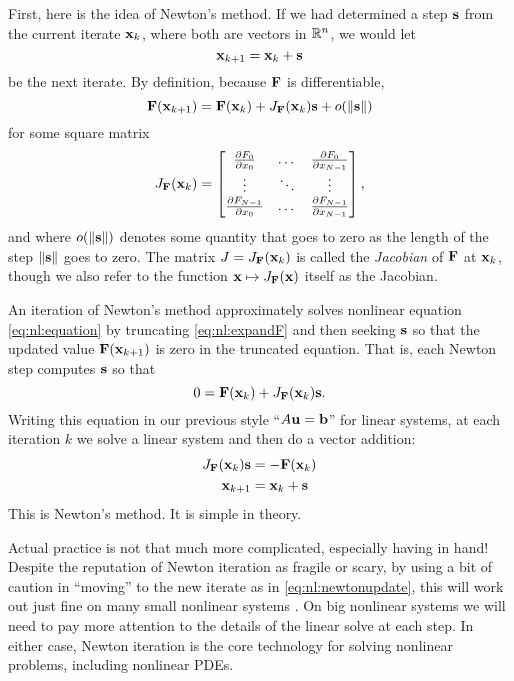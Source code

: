 First, here is the idea of Newton's method.  If we had determined a step $\mathbf{s}$ from the current iterate $\mathbf{x}_k$, where both are vectors in $\mathbb{R}^n$, we would let
\begin{equation}
\mathbf{x}_{k+1} = \mathbf{x}_k + \mathbf{s} \label{eq:nl:firstupdate}
\end{equation}
be the next iterate.  By definition, because $\mathbf{F}$ is differentiable,
\begin{equation}
    \mathbf{F}(\mathbf{x}_{k+1}) = \mathbf{F}(\mathbf{x}_k) + J_{\mathbf{F}}(\mathbf{x}_k) \mathbf{s} + o(\|\mathbf{s}\|)  \label{eq:nl:expandF}
\end{equation}
for some square matrix
\begin{equation}
J_{\mathbf{F}}(\mathbf{x}_k) = \begin{bmatrix}
    \frac{\partial F_0}{\partial x_0} & \dots & \frac{\partial F_0}{\partial x_{N-1}} \\
    \vdots & \ddots & \vdots \\
    \frac{\partial F_{N-1}}{\partial x_0} & \dots & \frac{\partial F_{N-1}}{\partial x_{N-1}}  \end{bmatrix},  \label{eq:nl:jacdefn}
\end{equation}
and where $o(\|\mathbf{s}\|)$ denotes some quantity that goes to zero as the length of the step $\|\mathbf{s}\|$ goes to zero.  The matrix $J = J_{\mathbf{F}}(\mathbf{x}_k)$ is called the \emph{Jacobian} of $\mathbf{F}$ at $\mathbf{x}_k$, though we also refer to the function $\mathbf{x} \mapsto J_{\mathbf{F}}(\mathbf{x})$ itself as the Jacobian.

An iteration of Newton's method approximately solves nonlinear equation \eqref{eq:nl:equation} by truncating \eqref{eq:nl:expandF} and then seeking $\mathbf{s}$ so that the updated value $\mathbf{F}(\mathbf{x}_{k+1})$ is zero in the truncated equation.  That is, each Newton step computes $\mathbf{s}$ so that
\begin{equation}
    0 = \mathbf{F}(\mathbf{x}_k) + J_{\mathbf{F}}(\mathbf{x}_k) \mathbf{s}.
\end{equation}
Writing this equation in our previous style ``$A\mathbf{u}=\mathbf{b}$'' for linear systems, at each iteration $k$ we solve a linear system and then do a vector addition:
\begin{align}
    J_{\mathbf{F}}(\mathbf{x}_k) \mathbf{s} &= - \mathbf{F}(\mathbf{x}_k)  \label{eq:nl:newtoneq}  \\
    \mathbf{x}_{k+1} &= \mathbf{x}_k + \mathbf{s}  \label{eq:nl:newtonupdate}
\end{align}
This is Newton's method.  It is simple in theory.

Actual practice is not that much more complicated, especially having \PETSc in hand!  Despite the reputation of Newton iteration as fragile or scary, by using a bit of caution in ``moving'' to the new iterate as in \eqref{eq:nl:newtonupdate}, this will work out just fine on many small nonlinear systems \citep{Kelley2003}.  On big nonlinear systems we will need to pay more attention to the details of the linear solve at each step.  In either case, Newton iteration is the core technology for solving nonlinear problems, including nonlinear PDEs.

